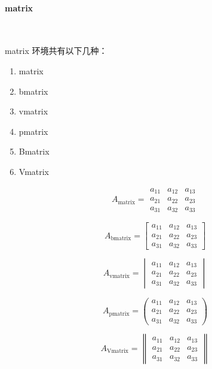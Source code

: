 \paragraph{matrix}~{}

matrix 环境共有以下几种：

\begin{enumerate}[topsep=0pt,itemsep=0pt,parsep=0pt,leftmargin=3.6em,label=\arabic*>]
    \item matrix
    \item bmatrix
    \item vmatrix
    \item pmatrix
    \item Bmatrix
    \item Vmatrix
\end{enumerate}

\[ A_{\mathrm{matrix}} = 
\begin{matrix}
    a_{11} & a_{12} & a_{13} \\
    a_{21} & a_{22} & a_{23} \\
    a_{31} & a_{32} & a_{33}
\end{matrix}
\]

\[ A_{\mathrm{bmatrix}} = 
\begin{bmatrix}
    a_{11} & a_{12} & a_{13} \\
    a_{21} & a_{22} & a_{23} \\
    a_{31} & a_{32} & a_{33}
\end{bmatrix}
\]

\[ A_{\mathrm{vmatrix}} = 
\begin{vmatrix}
    a_{11} & a_{12} & a_{13} \\
    a_{21} & a_{22} & a_{23} \\
    a_{31} & a_{32} & a_{33}
\end{vmatrix}
\]

\[ A_{\mathrm{pmatrix}} = 
\begin{pmatrix}
    a_{11} & a_{12} & a_{13} \\
    a_{21} & a_{22} & a_{23} \\
    a_{31} & a_{32} & a_{33}
\end{pmatrix}
\]

\[ A_{\mathrm{Vmatrix}} = 
\begin{Vmatrix}
    a_{11} & a_{12} & a_{13} \\
    a_{21} & a_{22} & a_{23} \\
    a_{31} & a_{32} & a_{33}
\end{Vmatrix}
\]

